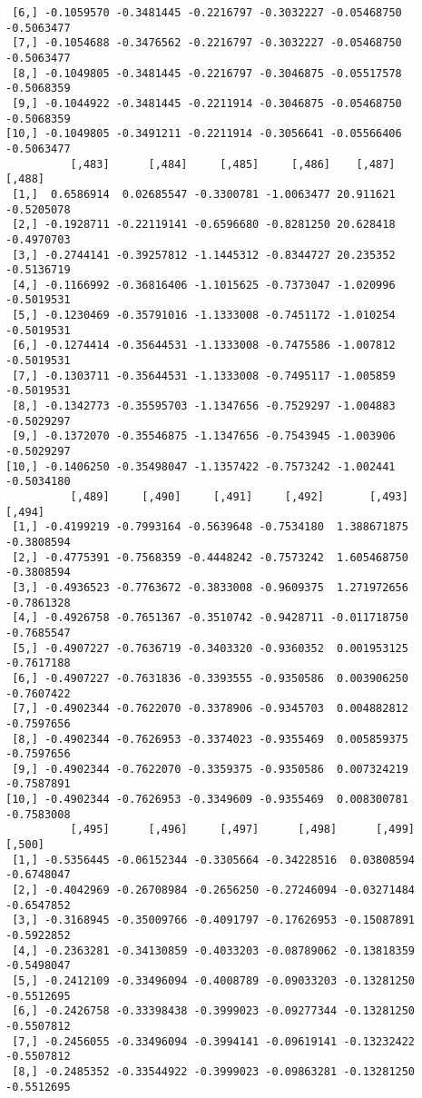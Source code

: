 \documentclass[
  letterpaper,
  DIV=11,
  numbers=noendperiod]{scrreprt}
\begin{document}
\begin{verbatim}
 [6,] -0.1059570 -0.3481445 -0.2216797 -0.3032227 -0.05468750 -0.5063477
 [7,] -0.1054688 -0.3476562 -0.2216797 -0.3032227 -0.05468750 -0.5063477
 [8,] -0.1049805 -0.3481445 -0.2216797 -0.3046875 -0.05517578 -0.5068359
 [9,] -0.1044922 -0.3481445 -0.2211914 -0.3046875 -0.05468750 -0.5068359
[10,] -0.1049805 -0.3491211 -0.2211914 -0.3056641 -0.05566406 -0.5063477
          [,483]      [,484]     [,485]     [,486]    [,487]     [,488]
 [1,]  0.6586914  0.02685547 -0.3300781 -1.0063477 20.911621 -0.5205078
 [2,] -0.1928711 -0.22119141 -0.6596680 -0.8281250 20.628418 -0.4970703
 [3,] -0.2744141 -0.39257812 -1.1445312 -0.8344727 20.235352 -0.5136719
 [4,] -0.1166992 -0.36816406 -1.1015625 -0.7373047 -1.020996 -0.5019531
 [5,] -0.1230469 -0.35791016 -1.1333008 -0.7451172 -1.010254 -0.5019531
 [6,] -0.1274414 -0.35644531 -1.1333008 -0.7475586 -1.007812 -0.5019531
 [7,] -0.1303711 -0.35644531 -1.1333008 -0.7495117 -1.005859 -0.5019531
 [8,] -0.1342773 -0.35595703 -1.1347656 -0.7529297 -1.004883 -0.5029297
 [9,] -0.1372070 -0.35546875 -1.1347656 -0.7543945 -1.003906 -0.5029297
[10,] -0.1406250 -0.35498047 -1.1357422 -0.7573242 -1.002441 -0.5034180
          [,489]     [,490]     [,491]     [,492]       [,493]     [,494]
 [1,] -0.4199219 -0.7993164 -0.5639648 -0.7534180  1.388671875 -0.3808594
 [2,] -0.4775391 -0.7568359 -0.4448242 -0.7573242  1.605468750 -0.3808594
 [3,] -0.4936523 -0.7763672 -0.3833008 -0.9609375  1.271972656 -0.7861328
 [4,] -0.4926758 -0.7651367 -0.3510742 -0.9428711 -0.011718750 -0.7685547
 [5,] -0.4907227 -0.7636719 -0.3403320 -0.9360352  0.001953125 -0.7617188
 [6,] -0.4907227 -0.7631836 -0.3393555 -0.9350586  0.003906250 -0.7607422
 [7,] -0.4902344 -0.7622070 -0.3378906 -0.9345703  0.004882812 -0.7597656
 [8,] -0.4902344 -0.7626953 -0.3374023 -0.9355469  0.005859375 -0.7597656
 [9,] -0.4902344 -0.7622070 -0.3359375 -0.9350586  0.007324219 -0.7587891
[10,] -0.4902344 -0.7626953 -0.3349609 -0.9355469  0.008300781 -0.7583008
          [,495]      [,496]     [,497]      [,498]      [,499]     [,500]
 [1,] -0.5356445 -0.06152344 -0.3305664 -0.34228516  0.03808594 -0.6748047
 [2,] -0.4042969 -0.26708984 -0.2656250 -0.27246094 -0.03271484 -0.6547852
 [3,] -0.3168945 -0.35009766 -0.4091797 -0.17626953 -0.15087891 -0.5922852
 [4,] -0.2363281 -0.34130859 -0.4033203 -0.08789062 -0.13818359 -0.5498047
 [5,] -0.2412109 -0.33496094 -0.4008789 -0.09033203 -0.13281250 -0.5512695
 [6,] -0.2426758 -0.33398438 -0.3999023 -0.09277344 -0.13281250 -0.5507812
 [7,] -0.2456055 -0.33496094 -0.3994141 -0.09619141 -0.13232422 -0.5507812
 [8,] -0.2485352 -0.33544922 -0.3999023 -0.09863281 -0.13281250 -0.5512695

\end{verbatim}
\end{document}
